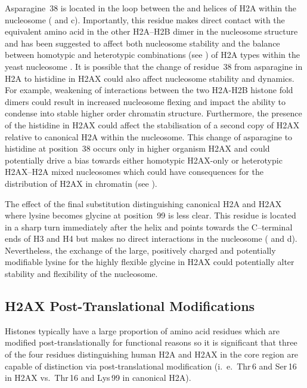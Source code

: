 Asparagine~38 is located in the loop between the  and  helices of H2A within the
nucleosome ( and c). Importantly, this residue makes
direct contact with the equivalent amino acid in the other H2A--H2B dimer in the nucleosome structure
and has been suggested to affect both nucleosome stability and the balance between homotypic and
heterotypic combinations (see ) of H2A types within the yeast
nucleosome \citep{CLW01}. It is possible that the change of residue~38 from asparagine in H2A to
histidine in H2AX could also affect nucleosome stability and dynamics. For example, weakening of
interactions between the two H2A-H2B histone fold dimers could result in increased nucleosome
flexing and impact the ability to condense into stable higher order chromatin structure. Furthermore,
the presence of the histidine in H2AX could affect the stabilisation of a second copy of H2AX
relative to canonical H2A within the nucleosome. This change of asparagine to histidine at
position~38 occurs only in higher organism H2AX and could potentially drive a bias towards either
homotypic H2AX-only or heterotypic H2AX--H2A mixed nucleosomes which could have consequences for the
distribution of H2AX in chromatin (see ).

The effect of the final substitution distinguishing canonical H2A and H2AX where lysine becomes
glycine at position~99 is less clear. This residue is located in a sharp turn immediately after
the  helix and points towards the C--terminal ends of H3 and H4 but makes no direct
interactions in the nucleosome ( and d). Nevertheless,
the exchange of the large, positively charged and potentially modifiable lysine for the highly
flexible glycine in H2AX could potentially alter stability and flexibility of the nucleosome.

\subsection{H2AX Post-Translational Modifications}
\label{subsec:h2ax-review:H2AX-PTM}
Histones typically have a large proportion of amino acid residues which are modified post-translationally
for functional reasons so it is significant that three of the four residues distinguishing human H2A
and H2AX in the core region are capable of distinction via post-translational modification
(i.~e.\ Thr\,6 and Ser\,16 in H2AX vs.\ Thr\,16 and Lys\,99 in canonical H2A).

